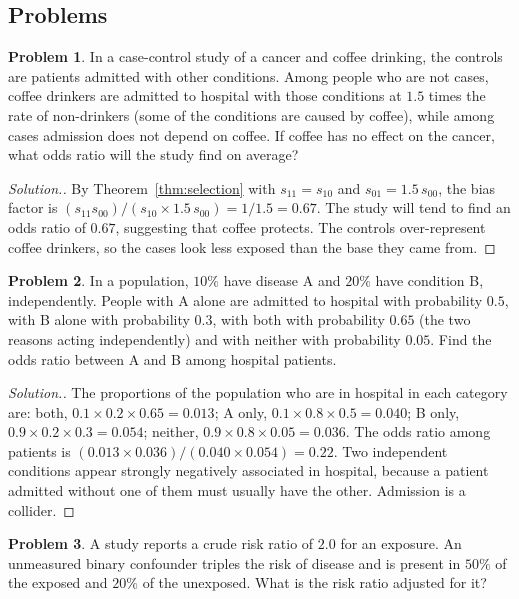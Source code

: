 \documentclass[11pt,a4paper]{article}
\numberwithin{equation}{section}
\theoremstyle{definition}
\newtheorem{problemx}{Problem}[subsection]
\newenvironment{problem}{\begin{problemx}}{\end{problemx}}
\newenvironment{solution}
  {\renewcommand{\qedsymbol}{}\begin{proof}[\textit{Solution}.]}
  {\end{proof}}
\begin{document}
\subsection{Problems}

\begin{problem}
\label{prob:hospital}
In a case-control study of a cancer and coffee drinking, the controls are patients admitted with other conditions. Among people who
are not cases, coffee drinkers are admitted to hospital with those conditions at $1.5$ times the rate of non-drinkers (some of the
conditions are caused by coffee), while among cases admission does not depend on coffee. If coffee has no effect on the cancer, what odds
ratio will the study find on average?
\end{problem}

\begin{solution}
By Theorem~\ref{thm:selection} with $s_{11} = s_{10}$ and $s_{01} = 1.5\,s_{00}$, the bias factor is $(s_{11}s_{00})/(s_{10} \times 1.5\,s_{00}) = 1/1.5 = 0.67$. The study will tend to
find an odds ratio of $0.67$, suggesting that coffee protects. The controls over-represent coffee drinkers, so the cases look less
exposed than the base they came from.
\end{solution}

\begin{problem}
\label{prob:berkson}
In a population, $10\%$ have disease A and $20\%$ have condition B, independently. People with A alone are admitted to hospital with
probability $0.5$, with B alone with probability $0.3$, with both with probability $0.65$ (the two reasons acting independently) and with
neither with probability $0.05$. Find the odds ratio between A and B among hospital patients.
\end{problem}

\begin{solution}
The proportions of the population who are in hospital in each category are: both, $0.1 \times 0.2 \times 0.65 = 0.013$; A only, $0.1 \times 0.8 \times 0.5 = 0.040$; B only,
$0.9 \times 0.2 \times 0.3 = 0.054$; neither, $0.9 \times 0.8 \times 0.05 = 0.036$. The odds ratio among patients is $(0.013 \times 0.036)/(0.040 \times 0.054) = 0.22$. Two independent
conditions appear strongly negatively associated in hospital, because a patient admitted without one of them must usually have the
other. Admission is a collider.
\end{solution}

\begin{problem}
A study reports a crude risk ratio of $2.0$ for an exposure. An unmeasured binary confounder triples the risk of disease and is present
in $50\%$ of the exposed and $20\%$ of the unexposed. What is the risk ratio adjusted for it?
\end{problem}
\end{document}
